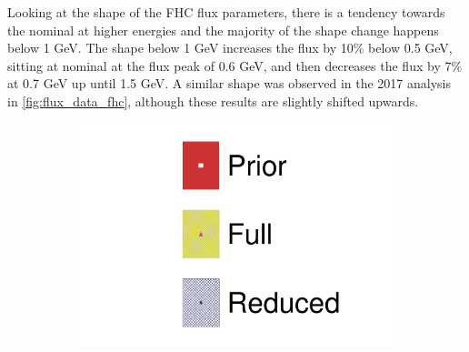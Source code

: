 Looking at the shape of the FHC flux parameters, there is a tendency towards the nominal at higher energies and the majority of the shape change happens below 1 GeV. The shape below 1 GeV increases the flux by 10\% below 0.5 GeV, sitting at nominal at the flux peak of 0.6 GeV, and then decreases the flux by 7\% at 0.7 GeV up until 1.5 GeV. A similar shape was observed in the 2017 analysis in \autoref{fig:flux_data_fhc}, although these results are slightly shifted upwards.
\begin{figure}[h]
	\centering
	\begin{subfigure}[t]{0.10\textwidth}
		\includegraphics[width=\textwidth,page=1, trim={0mm 0mm 0mm 9mm}, clip]{figures/mach3/2018/data/2018a_FixedCov_FullCov_Mpi_Data_merg_2018a_FixedCov_RedCov_Mpi_Data_merge}
	\end{subfigure}
	

\end{figure}
